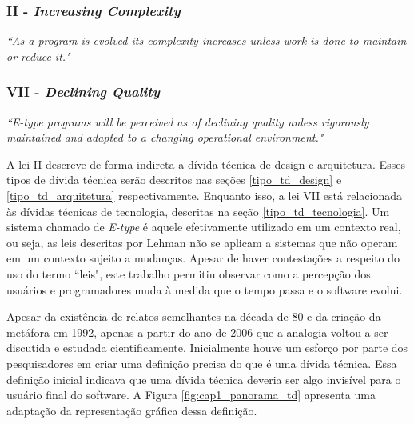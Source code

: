 \subsubsection{II - \textit{Increasing Complexity}}
\textit{``As a program is evolved its complexity increases unless work is done to maintain or reduce it."}

\subsubsection{VII - \textit{Declining Quality}}
\textit{``E-type programs will be perceived as of declining quality unless rigorously maintained and
adapted to a changing operational environment."}

A lei II descreve de forma indireta a dívida técnica de design e arquitetura. Esses tipos de dívida técnica serão descritos nas seções \ref{tipo_td_design} e \ref{tipo_td_arquitetura} respectivamente. Enquanto isso, a lei VII está relacionada às dívidas técnicas de tecnologia, descritas na seção \ref{tipo_td_tecnologia}. Um sistema chamado de \textit{E-type} é aquele efetivamente utilizado em um contexto real, ou seja, as leis descritas por Lehman não se aplicam a sistemas que não operam em um contexto sujeito a mudanças.  Apesar de haver contestações a respeito do uso do termo ``leis", este trabalho permitiu observar como a percepção dos usuários e programadores muda à medida que o tempo passa e o software evolui.  

Apesar da existência de relatos semelhantes na década de 80 e da criação da metáfora em 1992, apenas a partir do ano de 2006 \cite{mar2006technical} que a analogia voltou a ser discutida e estudada cientificamente. Inicialmente houve um esforço por parte dos pesquisadores em criar uma definição precisa do que é uma dívida técnica. Essa definição inicial indicava que uma dívida técnica deveria ser algo invisível para o usuário final do software. A Figura \ref{fig:cap1_panorama_td} apresenta uma adaptação da representação gráfica dessa definição. 

